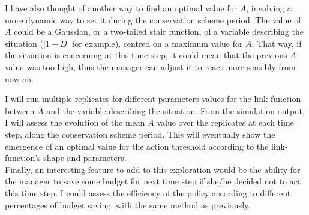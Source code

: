 \documentclass[12pt,a4paper]{article}
\begin{document}
I have also thought of another way to find an optimal value for $A$, involving a more dynamic way to set it during the conservation scheme period.
The value of $A$ could be a Gaussian, or a two-tailed stair function, of a variable describing the situation ($|1-D|$ for example), centred on a maximum value for $A$.
That way, if the situation is concerning at this time step, it could mean that the previous $A$ value was too high, thus the manager can adjust it to react more sensibly from now on.

I will run multiple replicates for different parameters values for the link-function between $A$ and the variable describing the situation.
From the simulation output, I will assess the evolution of the mean $A$ value over the replicates at each time step, along the conservation scheme period.
This will eventually show the emergence of an optimal value for the action threshold according to the link-function's shape and parameters.\\

Finally, an interesting feature to add to this exploration would be the ability for the manager to save some budget for next time step if she/he decided not to act this time step.
I could assess the efficiency of the policy according to different percentages of budget saving, with the same method as previously. %

%
%
\end{document}
